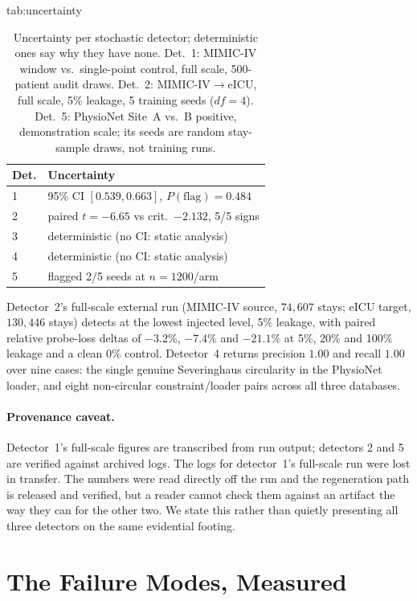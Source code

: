 \documentclass[pmlr,twocolumn,10pt]{jmlr}
\begin{document}
\begin{table}[htbp]
\floatconts
  {tab:uncertainty}
  {\caption{Uncertainty per stochastic detector; deterministic ones say why
   they have none. Det.~1: MIMIC-IV window vs.\ single-point control, full
   scale, 500-patient audit draws. Det.~2: MIMIC-IV$\to$eICU, full scale, 5\%
   leakage, 5 training seeds ($df=4$). Det.~5: PhysioNet Site~A vs.~B positive,
   demonstration scale; its seeds are random stay-sample draws, not training
   runs.}}
  {\small
  \begin{tabular}{@{}ll@{}}
  \toprule
  \bfseries Det. & \bfseries Uncertainty\\
  \midrule
  1 & 95\% CI $[0.539, 0.663]$, $P(\text{flag})=0.484$\\
  2 & paired $t=-6.65$ vs crit.\ $-2.132$, 5/5 signs\\
  3 & deterministic (no CI: static analysis)\\
  4 & deterministic (no CI: static analysis)\\
  5 & flagged 2/5 seeds at $n=1200$/arm\\
  \bottomrule
  \end{tabular}}
\end{table}

Detector~2's full-scale external run (MIMIC-IV source, $74{,}607$ stays; eICU
target, $130{,}446$ stays) detects at the lowest injected level, 5\% leakage,
with paired relative probe-loss deltas of $-3.2\%$, $-7.4\%$ and $-21.1\%$ at
5\%, 20\% and 100\% leakage and a clean 0\% control. Detector~4 returns
precision $1.00$ and recall $1.00$ over nine cases: the single genuine
Severinghaus circularity in the PhysioNet loader, and eight non-circular
constraint/loader pairs across all three databases.

\paragraph{Provenance caveat.} Detector~1's full-scale figures are transcribed
from run output; detectors 2 and 5 are verified against archived logs. The logs
for detector~1's full-scale run were lost in transfer. The numbers were read
directly off the run and the regeneration path is released and verified, but a
reader cannot check them against an artifact the way they can for the other two.
We state this rather than quietly presenting all three detectors on the same
evidential footing.

\section{The Failure Modes, Measured}
\label{sec:measured}
\end{document}

